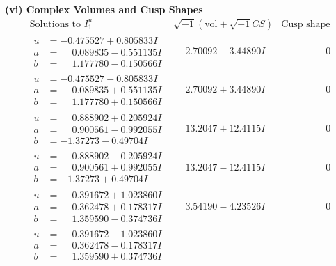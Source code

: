 \documentclass[1p]{elsarticle_modified}
\theoremstyle{definition}
\newcommand{\I}{\sqrt{-1}}
\begin{document}
\newpage\flushleft \textbf{(vi) Complex Volumes and Cusp Shapes}
$$\begin{array}{c|c|c}  
\text{Solutions to }I^u_{1}& \I (\text{vol} + \sqrt{-1}CS) & \text{Cusp shape}\\
 \hline 
\begin{aligned}
u &= -0.475527 + 0.805833 I \\
a &= \phantom{-}0.089835 - 0.551135 I \\
b &= \phantom{-}1.177780 - 0.150566 I\end{aligned}
 & \phantom{-}2.70092 - 3.44890 I & \phantom{-0.000000 } 0 \\ \hline\begin{aligned}
u &= -0.475527 - 0.805833 I \\
a &= \phantom{-}0.089835 + 0.551135 I \\
b &= \phantom{-}1.177780 + 0.150566 I\end{aligned}
 & \phantom{-}2.70092 + 3.44890 I & \phantom{-0.000000 } 0 \\ \hline\begin{aligned}
u &= \phantom{-}0.888902 + 0.205924 I \\
a &= \phantom{-}0.900561 - 0.992055 I \\
b &= -1.37273 - 0.49704 I\end{aligned}
 & \phantom{-}13.2047 + 12.4115 I & \phantom{-0.000000 } 0 \\ \hline\begin{aligned}
u &= \phantom{-}0.888902 - 0.205924 I \\
a &= \phantom{-}0.900561 + 0.992055 I \\
b &= -1.37273 + 0.49704 I\end{aligned}
 & \phantom{-}13.2047 - 12.4115 I & \phantom{-0.000000 } 0 \\ \hline\begin{aligned}
u &= \phantom{-}0.391672 + 1.023860 I \\
a &= \phantom{-}0.362478 + 0.178317 I \\
b &= \phantom{-}1.359590 - 0.374736 I\end{aligned}
 & \phantom{-}3.54190 - 4.23526 I & \phantom{-0.000000 } 0 \\ \hline\begin{aligned}
u &= \phantom{-}0.391672 - 1.023860 I \\
a &= \phantom{-}0.362478 - 0.178317 I \\
b &= \phantom{-}1.359590 + 0.374736 I\end{aligned}

\end{array}$$
\end{document}
